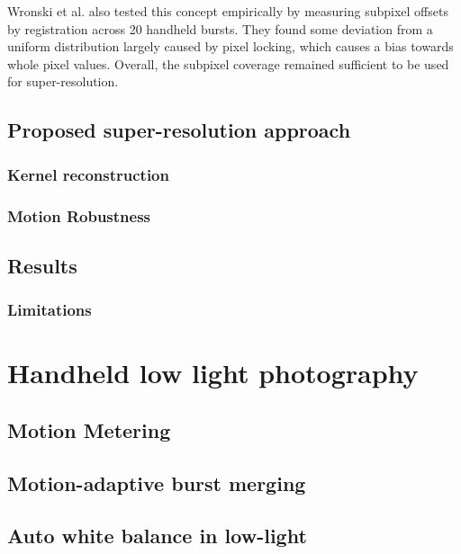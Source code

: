 \documentclass{sig-alternate}
\begin{document}
Wronski et al. also tested this concept empirically by measuring subpixel offsets by registration across 20 handheld bursts. They found some deviation from a uniform distribution largely caused by pixel locking, which causes a bias towards whole pixel values. Overall, the subpixel coverage remained sufficient to be used for super-resolution.

\subsection{Proposed super-resolution approach}

\subsubsection{Kernel reconstruction}
\label{sec:kernelReconstruction}

\subsubsection{Motion Robustness}
\label{sec:robustnessModel}

\subsection{Results}

\subsubsection{Limitations}

\section{Handheld low light photography}



\subsection{Motion Metering}


\subsection{Motion-adaptive burst merging}


\subsection{Auto white balance in low-light}
\end{document}
